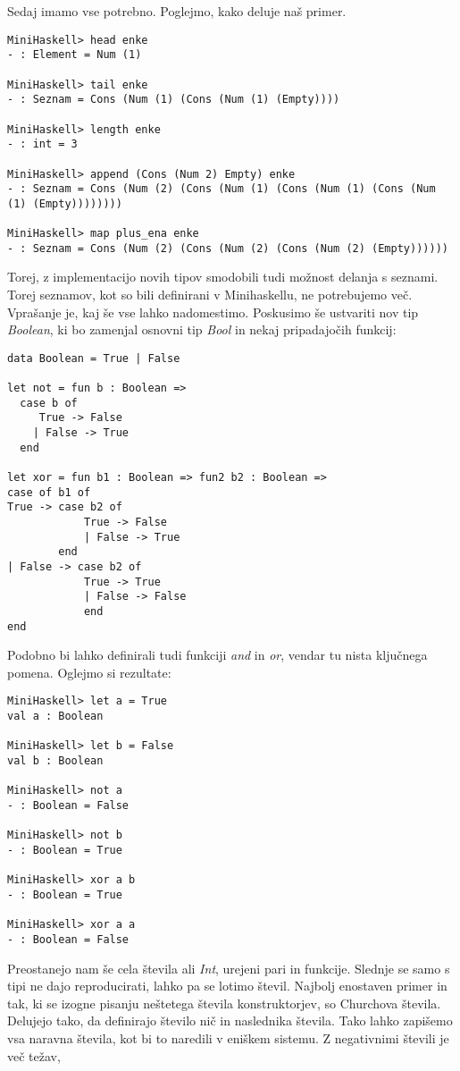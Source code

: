 \documentclass[12pt,a4paper,openany]{book}
\begin{document}
Sedaj imamo vse potrebno. Poglejmo, kako deluje naš primer.
\begin{lstlisting}
MiniHaskell> head enke
- : Element = Num (1)

MiniHaskell> tail enke
- : Seznam = Cons (Num (1) (Cons (Num (1) (Empty))))

MiniHaskell> length enke
- : int = 3

MiniHaskell> append (Cons (Num 2) Empty) enke
- : Seznam = Cons (Num (2) (Cons (Num (1) (Cons (Num (1) (Cons (Num (1) (Empty))))))))

MiniHaskell> map plus_ena enke
- : Seznam = Cons (Num (2) (Cons (Num (2) (Cons (Num (2) (Empty))))))
\end{lstlisting}
Torej, z implementacijo novih tipov smodobili tudi možnost delanja s seznami. Torej seznamov, kot so bili definirani v Minihaskellu, ne potrebujemo več. Vprašanje je, kaj še vse lahko nadomestimo.
Poskusimo še ustvariti nov tip \emph{Boolean}, ki bo zamenjal osnovni tip \emph{Bool} in nekaj pripadajočih funkcij:
\begin{lstlisting}
data Boolean = True | False
	
let not = fun b : Boolean => 
  case b of 
     True -> False 
    | False -> True 
  end

let xor = fun b1 : Boolean => fun2 b2 : Boolean =>
case of b1 of
True -> case b2 of
			True -> False
			| False -> True
		end
| False -> case b2 of
			True -> True
			| False -> False
			end
end
\end{lstlisting}
Podobno bi lahko definirali tudi funkciji \emph{and} in \emph{or}, vendar tu nista ključnega pomena. Oglejmo si rezultate:
\begin{lstlisting}
MiniHaskell> let a = True
val a : Boolean

MiniHaskell> let b = False
val b : Boolean

MiniHaskell> not a
- : Boolean = False

MiniHaskell> not b
- : Boolean = True

MiniHaskell> xor a b
- : Boolean = True

MiniHaskell> xor a a
- : Boolean = False
\end{lstlisting}
Preostanejo nam še cela števila ali \emph{Int}, urejeni pari in funkcije. Slednje se samo s tipi ne dajo reproducirati, lahko pa se lotimo števil. Najbolj enostaven primer in tak, ki se izogne pisanju neštetega števila 
konstruktorjev, so Churchova števila. Delujejo tako, da definirajo število nič in naslednika števila. Tako lahko zapišemo vsa naravna števila, kot bi to naredili v eniškem sistemu. Z negativnimi števili je več težav, 
\end{document}

